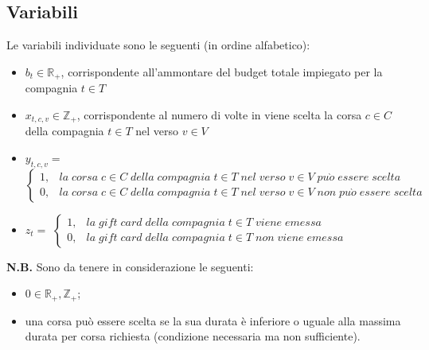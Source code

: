 \documentclass[main.tex]{subfiles}
\begin{document}
\subsection*{Variabili}
Le variabili individuate sono le seguenti (in ordine alfabetico):
\begin{itemize}
    \item $b_t \in \mathbb{R}_+$, corrispondente all'ammontare del budget totale impiegato per la compagnia $t \in T$
    \item $x_{t,c,v} \in \mathbb{Z}_+$, corrispondente al numero di volte in viene scelta la corsa $c \in C$ della compagnia $t \in T$ nel verso $v \in V$
    \item $y_{t,c,v} =$
    \begin{math} { \begin{cases}
        1, & la\; corsa\; \text{$c \in C$}\; della\; compagnia\; \text{$t \in T$}\; nel\; verso\; \text{$v \in V$}\; pu\grave{o}\; essere\; scelta \\
        0, & la\; corsa\; \text{$c \in C$}\; della\; compagnia\; \text{$t \in T$}\; nel\; verso\; \text{$v \in V$}\; non\; pu\grave{o}\; essere\; scelta
    \end{cases} } \end{math}
    \item $z_t =$
    \begin{math} { \begin{cases}
        1, & la\; gift\; card\; della\; compagnia\; \text{$t \in T$}\; viene\; emessa \\
        0, & la\; gift\; card\; della\; compagnia\; \text{$t \in T$}\; non\; viene\; emessa 
    \end{cases} } \end{math}
\end{itemize}
\textbf{N.B.} Sono da tenere in considerazione le seguenti:
\begin{itemize}
    \item $0 \in \mathbb{R}_+, \mathbb{Z}_+$;
    \item una corsa può essere scelta se la sua durata è inferiore o uguale alla massima durata per corsa richiesta (condizione necessaria ma non sufficiente).
\end{itemize}
\end{document}
